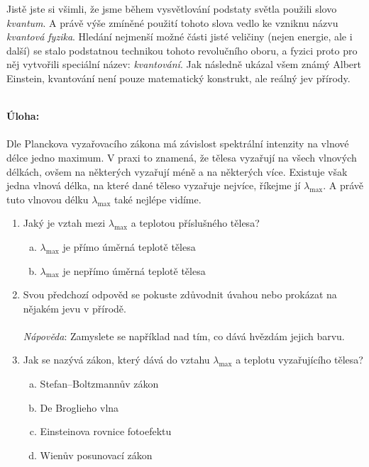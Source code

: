 \documentclass{../../../../style/mkimain}
\begin{document}
Jistě jste si všimli, že jsme během vysvětlování podstaty světla použili slovo \textit{kvantum}.
A právě výše zmíněné použití tohoto slova vedlo ke vzniknu názvu \textit{kvantová fyzika}.
Hledání nejmenší možné části jisté veličiny (nejen energie, ale i další) se stalo podstatnou technikou tohoto revolučního oboru,
a fyzici proto pro něj vytvořili speciální název: \textit{kvantování}.
Jak následně ukázal všem známý Albert Einstein, kvantování není pouze matematický konstrukt, ale reálný jev přírody.
\\
\\
\begin{center}
\end{center}
\textbf{Úloha:}
\\
\\
Dle Planckova vyzařovacího zákona má závislost spektrální intenzity na vlnové délce jedno maximum.
V praxi to znamená, že tělesa vyzařují na všech vlnových délkách, ovšem na některých vyzařují méně a na některých více.
Existuje však jedna vlnová délka, na které dané těleso vyzařuje nejvíce, říkejme jí $\lambda_\mathrm{max}$.
A právě tuto vlnovou délku $\lambda_\mathrm{max}$ také nejlépe vidíme.
\begin{enumerate}
    \item Jaký je vztah mezi $\lambda_\mathrm{max}$ a teplotou příslušného tělesa?
    \begin{enumerate}[a)]
        \item $\lambda_\mathrm{max}$ je přímo úměrná teplotě tělesa
        \item $\lambda_\mathrm{max}$ je nepřímo úměrná teplotě tělesa
    \end{enumerate}
    \item Svou předchozí odpověd se pokuste zdůvodnit úvahou nebo prokázat na nějakém jevu v přírodě.
    \\\\
    \emph{Nápověda}: Zamyslete se například nad tím, co dává hvězdám jejich barvu.
    \item Jak se nazývá zákon, který dává do vztahu $\lambda_\mathrm{max}$ a teplotu vyzařujícího tělesa?
    \begin{enumerate}[a)]
        \item Stefan–Boltzmannův zákon
        \item De Broglieho vlna
        \item Einsteinova rovnice fotoefektu
        \item Wienův posunovací zákon
    \end{enumerate} 
\end{enumerate}
\end{document}
